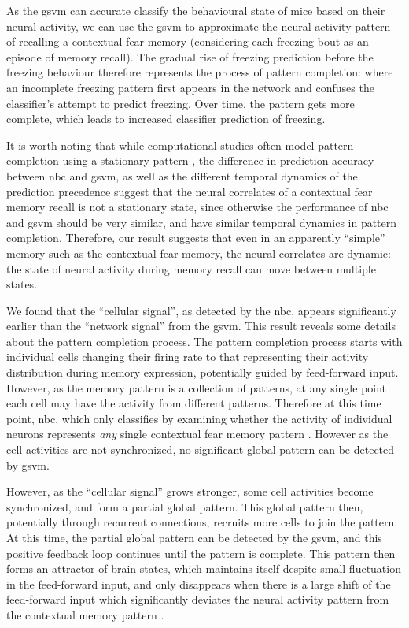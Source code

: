 As the \gls{gsvm} can accurate classify the behavioural state of mice based on their neural activity, we can use the \gls{gsvm} to approximate the neural activity pattern of recalling a contextual fear memory (considering each freezing bout as an episode of memory recall). The gradual rise of freezing prediction before the freezing behaviour therefore represents the process of pattern completion: where an incomplete freezing pattern first appears in the network and confuses the classifier's attempt to predict freezing. Over time, the pattern gets more complete, which leads to increased classifier prediction of freezing. 

It is worth noting that while computational studies often model pattern completion using a stationary pattern \citep{rolls13}, the difference in prediction accuracy between \gls{nbc} and \gls{gsvm}, as well as the different temporal dynamics of the prediction precedence suggest that the neural correlates of a contextual fear memory recall is not a stationary state, since otherwise the performance of \gls{nbc} and \gls{gsvm} should be very similar, and have similar temporal dynamics in pattern completion.  Therefore, our result suggests that even in an apparently ``simple'' memory such as the contextual fear memory, the neural correlates are dynamic: the state of neural activity during memory recall can move between multiple states.

We found that the ``cellular signal'', as detected by the \gls{nbc}, appears significantly earlier than the ``network signal'' from the \gls{gsvm}. This result reveals some details about the pattern completion process. The pattern completion process starts with individual cells changing their firing rate to that representing their activity distribution during memory expression, potentially guided by feed-forward input. However, as the memory pattern is a collection of patterns, at any single point each cell may have the activity from different patterns. Therefore at this time point, \gls{nbc}, which only classifies by examining whether the activity of individual neurons represents \textit{any} single contextual fear memory pattern . However as the cell activities are not synchronized, no significant global pattern can be detected by \gls{gsvm}. 

However, as the ``cellular signal'' grows stronger, some cell activities become synchronized, and form a partial global pattern. This global pattern then, potentially through recurrent connections, recruits more cells to join the pattern. At this time, the partial global pattern can be detected by the \gls{gsvm}, and this positive feedback loop continues until the pattern is complete. This pattern then forms an attractor of brain states, which maintains itself despite small fluctuation in the feed-forward input, and only disappears when there is a large shift of the feed-forward input which significantly deviates the neural activity pattern from the contextual memory pattern \citep{rolls13}. 

